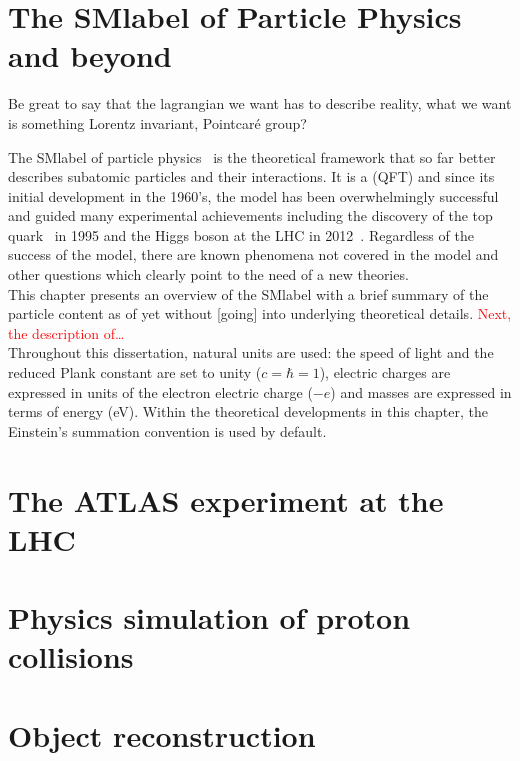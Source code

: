 \chapter{The \acrlong{SMlabel} of Particle Physics and beyond}

Be great to say that the lagrangian we want has to describe reality, what we want is something Lorentz invariant, Pointcaré group?

The \acrfull{SMlabel} of particle physics~\cite{PhysRevLett.19.1264,GLASHOW1961579,RevModPhys.52.525} is the theoretical framework
that so far better describes subatomic particles and their interactions.
It is a  (\acrshort{QFT}) and since its initial development in the 1960's,
the model has been overwhelmingly successful and guided many experimental achievements
including the discovery of the top quark~\cite{topsearch1995,PhysRevLett.74.2626} in 1995
and the Higgs boson at the LHC in 2012~\cite{ATLASHiggs2012,CMShiggs2012}.
Regardless of the success of the model, there are known phenomena not covered in the model
and other questions which clearly point to the need of a new theories.\\
This chapter presents an overview of the \acrshort{SMlabel} with a brief summary of the particle content as of yet without
[going] into underlying theoretical details. \textcolor{red}{Next, the description of\ldots}\\

Throughout this dissertation, natural units are used: the speed of light and the reduced Plank constant are set to unity ($c=\hbar=1$),
electric charges are expressed in units of the electron electric charge ($-e$) and masses are expressed in terms of energy (eV).
Within the theoretical developments in this chapter, the Einstein's summation convention is used by default. 



\chapter{The ATLAS experiment at the LHC}



\chapter{Physics simulation of proton collisions}



\chapter{Object reconstruction}



